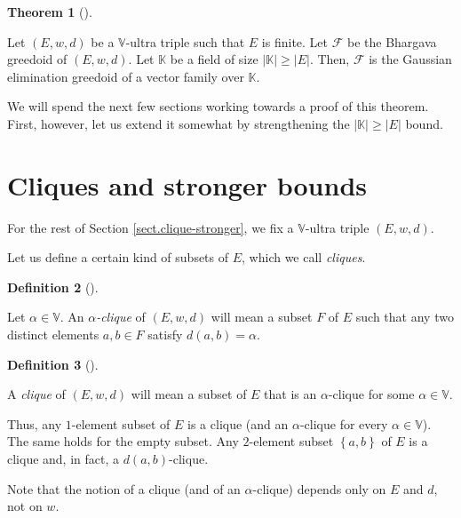 \documentclass[numbers=enddot,12pt,final,onecolumn,notitlepage]{scrartcl}%
\theoremstyle{definition}
\newtheorem{theo}{Theorem}[section]
\newenvironment{theorem}[1][]
{\begin{theo}[#1]\begin{leftbar}}
{\end{leftbar}\end{theo}}
\newtheorem{defi}[theo]{Definition}
\newenvironment{definition}[1][]
{\begin{defi}[#1]\begin{leftbar}}
{\end{leftbar}\end{defi}}
\renewcommand{\geq}{\geqslant}
\theoremstyle{plainsl}
\begin{document}
\begin{theorem}
\label{thm.bh-geg}Let $\left(  E,w,d\right)  $ be a $\mathbb{V}$-ultra triple
such that $E$ is finite. Let $\mathcal{F}$ be the Bhargava greedoid of
$\left(  E,w,d\right)  $. Let $\mathbb{K}$ be a field of size $\left\vert
\mathbb{K}\right\vert \geq\left\vert E\right\vert $. Then, $\mathcal{F}$ is
the Gaussian elimination greedoid of a vector family over $\mathbb{K}$.
\end{theorem}


We will spend the next few sections working towards a proof of this theorem.
First, however, let us extend it somewhat by strengthening the $\left\vert
\mathbb{K}\right\vert \geq\left\vert E\right\vert $ bound.

\section{\label{sect.clique-stronger}Cliques and stronger bounds}

For the rest of Section \ref{sect.clique-stronger}, we fix a $\mathbb{V}%
$-ultra triple $\left(  E,w,d\right)  $.

Let us define a certain kind of subsets of $E$, which we call \textit{cliques}.

\begin{definition}
\label{def.alpha-clique}Let $\alpha\in\mathbb{V}$. An $\alpha$\textit{-clique}
of $\left(  E,w,d\right)  $ will mean a subset $F$ of $E$ such that any two
distinct elements $a,b\in F$ satisfy $d\left(  a,b\right)  =\alpha$.
\end{definition}

\begin{definition}
\label{def.clique}A \textit{clique} of $\left(  E,w,d\right)  $ will mean a
subset of $E$ that is an $\alpha$-clique for some $\alpha\in\mathbb{V}$.
\end{definition}

Thus, any $1$-element subset of $E$ is a clique (and an $\alpha$-clique for
every $\alpha\in\mathbb{V}$). The same holds for the empty subset. Any
$2$-element subset $\left\{  a,b\right\}  $ of $E$ is a clique and, in fact, a
$d\left(  a,b\right)  $-clique.

Note that the notion of a clique (and of an $\alpha$-clique) depends only on
$E$ and $d$, not on $w$.
\end{document}
